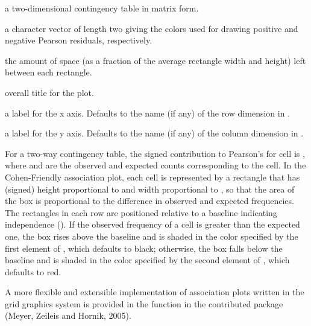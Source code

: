 %
\begin{Arguments}
\begin{ldescription}
\item[\code{x}] a two-dimensional contingency table in matrix form.
\item[\code{col}] a character vector of length two giving the colors used for
drawing positive and negative Pearson residuals, respectively.
\item[\code{space}] the amount of space (as a fraction of the average
rectangle width and height) left between each rectangle.
\item[\code{main}] overall title for the plot.
\item[\code{xlab}] a label for the x axis.  Defaults to the name (if any) of
the row dimension in .
\item[\code{ylab}] a label for the y axis.  Defaults to the name (if any) of
the column dimension in .
\end{ldescription}
\end{Arguments}
%
\begin{Details}\relax
For a two-way contingency table, the signed contribution to Pearson's
 for cell  is ,
where  and  are the observed and expected
counts corresponding to the cell.  In the Cohen-Friendly association
plot, each cell is represented by a rectangle that has (signed) height
proportional to  and width proportional to
, so that the area of the box is
proportional to the difference in observed and expected frequencies.
The rectangles in each row are positioned relative to a baseline
indicating independence ().  If the observed frequency
of a cell is greater than the expected one, the box rises above the
baseline and is shaded in the color specified by the first element of
, which defaults to black; otherwise, the box falls below
the baseline and is shaded in the color specified by the second
element of , which defaults to red.

A more flexible and extensible implementation of association plots
written in the grid graphics system is provided in the function
 in the contributed package 
(Meyer, Zeileis and Hornik, 2005).
\end{Details}
%
